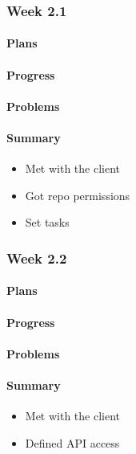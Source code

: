 \documentclass[onecolumn, draftclsnofoot,10pt, compsoc]{article}
\begin{document}
		  \subsubsection{Week 2.1}
			\paragraph{Plans} \hfill \break


			\paragraph{Progress} \hfill \break

			\paragraph{Problems} \hfill \break


			\paragraph{Summary} \hfill \break
			    \begin{itemize}
                    \item Met with the client
                    \item Got repo permissions
                    \item Set tasks
                \end{itemize}

		\subsubsection{Week 2.2}
			\paragraph{Plans}

			\paragraph{Progress} \hfill \break

			\paragraph{Problems} \hfill \break

			\paragraph{Summary}\hfill \break
			    \begin{itemize}
                    \item Met with the client
                    \item Defined API access
                \end{itemize}
\end{document}
